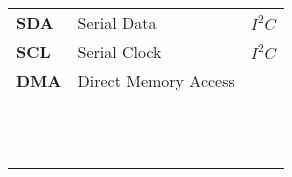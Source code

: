 \begin{tabular}{>{\bfseries}lll}
    SDA     & Serial Data       & $ I^2C $\\
    SCL     & Serial Clock      & $ I^2C $\\
    DMA     & Direct Memory Access& \\
    & & \\
    & & \\
    & & \\
    & & \\ 
    & & \\
    & & \\
    & & \\
    & & \\
    & & \\ 
    & & \\
    & & \\
    & & \\
    
\end{tabular}
